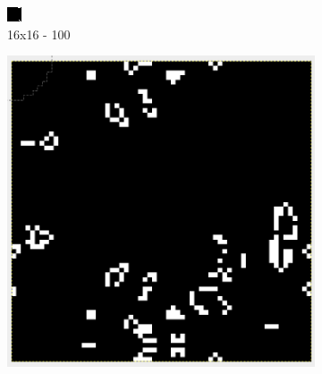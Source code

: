 \documentclass[]{article}
\begin{document}
\begin{figure}[!htb]
\begin{subfigure}{0.16\textwidth}
	\includegraphics[width=\linewidth]{images/16x16_100_Rounds.png}
	\caption{16x16 - 100}
\end{subfigure}
\begin{subfigure}{0.16\textwidth}
	\centering
	\includegraphics[width=\linewidth]{images/64x64_100_Rounds.png}

\end{subfigure}
\end{figure}
\end{document}
